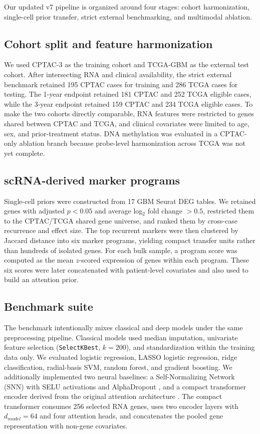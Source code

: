 Our updated v7 pipeline is organized around four stages: cohort harmonization, single-cell prior transfer, strict external benchmarking, and multimodal ablation.

\subsection{Cohort split and feature harmonization}
We used CPTAC-3 as the training cohort and TCGA-GBM as the external test cohort. After intersecting RNA and clinical availability, the strict external benchmark retained 195 CPTAC cases for training and 286 TCGA cases for testing. The 1-year endpoint retained 181 CPTAC and 252 TCGA eligible cases, while the 3-year endpoint retained 159 CPTAC and 234 TCGA eligible cases. To make the two cohorts directly comparable, RNA features were restricted to genes shared between CPTAC and TCGA, and clinical covariates were limited to age, sex, and prior-treatment status. DNA methylation was evaluated in a CPTAC-only ablation branch because probe-level harmonization across TCGA was not yet complete.

\subsection{scRNA-derived marker programs}
Single-cell priors were constructed from 17 GBM Seurat DEG tables. We retained genes with adjusted $p<0.05$ and average log$_2$ fold change $>0.5$, restricted them to the CPTAC/TCGA shared gene universe, and ranked them by cross-case recurrence and effect size. The top recurrent markers were then clustered by Jaccard distance into six marker programs, yielding compact transfer units rather than hundreds of isolated genes. For each bulk sample, a program score was computed as the mean $z$-scored expression of genes within each program. These six scores were later concatenated with patient-level covariates and also used to build an attention prior.

\subsection{Benchmark suite}
The benchmark intentionally mixes classical and deep models under the same preprocessing pipeline. Classical models used median imputation, univariate feature selection (\texttt{SelectKBest}, $k=200$), and standardization within the training data only. We evaluated logistic regression, LASSO logistic regression, ridge classification, radial-basis SVM, random forest, and gradient boosting. We additionally implemented two neural baselines: a Self-Normalizing Network (SNN) with SELU activations and AlphaDropout \cite{klambauer2017selfnormalizing}, and a compact transformer encoder derived from the original attention architecture \cite{vaswani2017attention}. The compact transformer consumes 256 selected RNA genes, uses two encoder layers with $d_{model}=64$ and four attention heads, and concatenates the pooled gene representation with non-gene covariates.

